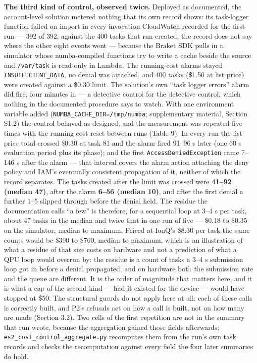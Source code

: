 \documentclass[acmsmall,screen,review]{acmart}
\begin{document}
\textbf{The third kind of control, observed twice.} Deployed as documented, the account-level solution metered nothing that its own record shows: its task-logger function failed on import in every invocation CloudWatch recorded for the first run --- 392 of 392, against the 400 tasks that run created; the record does not say where the other eight events went --- because the Braket SDK pulls in a simulator whose numba-compiled functions try to write a cache beside the source and \texttt{/var/task} is read-only in Lambda. The running-cost alarms stayed \texttt{INSUFFICIENT\_\allowbreak{}DATA}, no denial was attached, and 400 tasks (\$1.50 at list price) were created against a \$0.30 limit. The solution's own ``task logger errors'' alarm did fire, four minutes in --- a detective control for the detective control, which nothing in the documented procedure says to watch. With one environment variable added (\texttt{NUMBA\_\allowbreak{}CACHE\_\allowbreak{}DIR=/\allowbreak{}tmp/\allowbreak{}numba}; supplementary material, Section S1.2) the control behaved as designed, and the measurement was repeated five times with the running cost reset between runs (Table 9). In every run the list-price total crossed \$0.30 at task 81 and the alarm fired 91--96 s later (one 60 s evaluation period plus its phase); and the first \texttt{Access\allowbreak{}Denied\allowbreak{}Exception} came 7--146 s after the alarm --- that interval covers the alarm action attaching the deny policy and IAM's eventually consistent propagation of it, neither of which the record separates. The tasks created after the limit was crossed were \textbf{41--92 (median 47)}, after the alarm \textbf{6--56 (median 10)}, and after the first denial a further 1--5 slipped through before the denial held. The residue the documentation calls ``a few'' is therefore, for a sequential loop at 3--4 s per task, about 47 tasks in the median and twice that in one run of five --- \$0.18 to \$0.35 on the simulator, median to maximum. Priced at IonQ's \$8.30 per task the same counts would be \$390 to \$760, median to maximum, which is an illustration of what a residue of that size costs on hardware and not a prediction of what a QPU loop would overrun by: the residue is a count of tasks a 3--4 s submission loop got in before a denial propagated, and on hardware both the submission rate and the queue are different. It is the order of magnitude that matters here, and it is what a cap of the second kind --- had it existed for the device --- would have stopped at \$50. The structural guards do not apply here at all: each of these calls is correctly built, and P2's refusals act on how a call is built, not on how many are made (Section 3.2). Two cells of the first repetition are not in the summary that run wrote, because the aggregation gained those fields afterwards; \texttt{es2\_\allowbreak{}cost\_\allowbreak{}control\_\allowbreak{}aggregate.\allowbreak{}py} recomputes them from the run's own task records and checks the recomputation against every field the four later summaries do hold.
\end{document}
